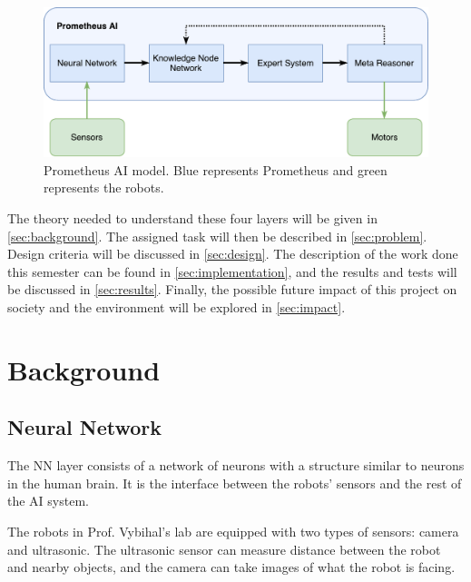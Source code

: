 \documentclass[titlepage,11pt]{article}
\begin{document}
\begin{figure}[!htb]
	\includegraphics[width=\columnwidth]{figures/ai_model.pdf}
	\caption[Prometheus AI model.]{Prometheus AI model. Blue represents Prometheus and green represents the robots.}
	\label{model}
\end{figure}

The theory needed to understand these four layers will be given in \autoref{sec:background}. The assigned task will then be described in \autoref{sec:problem}. Design criteria will be discussed in \autoref{sec:design}. The description of the work done this semester can be found in \autoref{sec:implementation}, and the results and tests will be discussed in \autoref{sec:results}. Finally, the possible future impact of this project on society and the environment will be explored in \autoref{sec:impact}.

\section{Background} \label{sec:background}

\subsection{Neural Network}

The NN layer consists of a network of neurons with a structure similar to neurons in the human brain. It is the interface between the robots' sensors and the rest of the AI system.

The robots in Prof. Vybihal's lab are equipped with two types of sensors: camera and ultrasonic. The ultrasonic sensor can measure distance between the robot and nearby objects, and the camera can take images of what the robot is facing.
\end{document}
